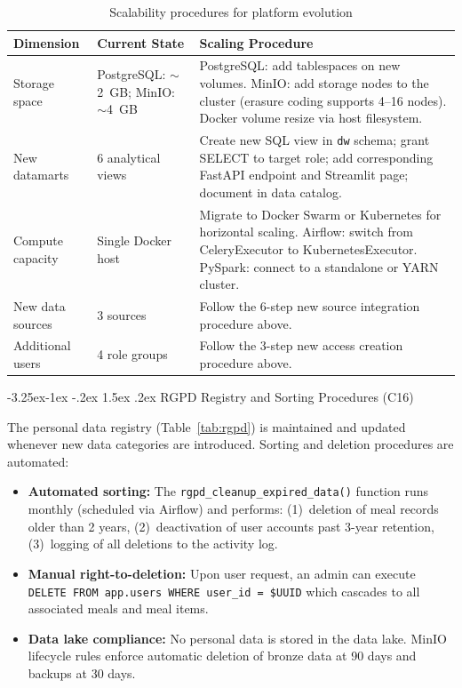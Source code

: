 \documentclass[a4paper,11pt,oneside,openany]{report}
\makeatletter
\renewcommand\subsection{\@startsection{subsection}{2}{\z@}%
  {-3.25ex\@plus -1ex \@minus -.2ex}%
  {1.5ex \@plus .2ex}%
  {\normalfont\large\bfseries\color{ntdarkgreen}}}
\newcommand{\rgpd}{RGPD}
\makeatother
\begin{document}
\begin{table}[H]
\centering
\caption{Scalability procedures for platform evolution}
\label{tab:scalability}
\begin{tabularx}{\textwidth}{L{3cm} L{3cm} L{6.5cm}}
\toprule
\textbf{Dimension} & \textbf{Current State} & \textbf{Scaling Procedure} \\
\midrule
Storage space & PostgreSQL: $\sim$2~GB; MinIO: $\sim$4~GB & PostgreSQL: add tablespaces on new volumes. MinIO: add storage nodes to the cluster (erasure coding supports 4--16 nodes). Docker volume resize via host filesystem. \\
New datamarts & 6 analytical views & Create new SQL view in \texttt{dw} schema; grant SELECT to target role; add corresponding FastAPI endpoint and Streamlit page; document in data catalog. \\
Compute capacity & Single Docker host & Migrate to Docker Swarm or Kubernetes for horizontal scaling. Airflow: switch from CeleryExecutor to KubernetesExecutor. PySpark: connect to a standalone or YARN cluster. \\
New data sources & 3 sources & Follow the 6-step new source integration procedure above. \\
Additional users & 4 role groups & Follow the 3-step new access creation procedure above. \\
\bottomrule
\end{tabularx}
\end{table}

\subsection{\rgpd{} Registry and Sorting Procedures (C16)}

The personal data registry (Table~\ref{tab:rgpd}) is maintained and updated
whenever new data categories are introduced. Sorting and deletion procedures
are automated:

\begin{itemize}[nosep]
  \item \textbf{Automated sorting:} The \texttt{rgpd\_cleanup\_expired\_data()}
        function runs monthly (scheduled via Airflow) and performs:
        (1)~deletion of meal records older than 2 years,
        (2)~deactivation of user accounts past 3-year retention,
        (3)~logging of all deletions to the activity log.
  \item \textbf{Manual right-to-deletion:} Upon user request, an admin can
        execute \texttt{DELETE FROM app.users WHERE user\_id = \$UUID} which
        cascades to all associated meals and meal items.
  \item \textbf{Data lake compliance:} No personal data is stored in the data
        lake. MinIO lifecycle rules enforce automatic deletion of bronze data
        at 90 days and backups at 30 days.
\end{itemize}
\end{document}
